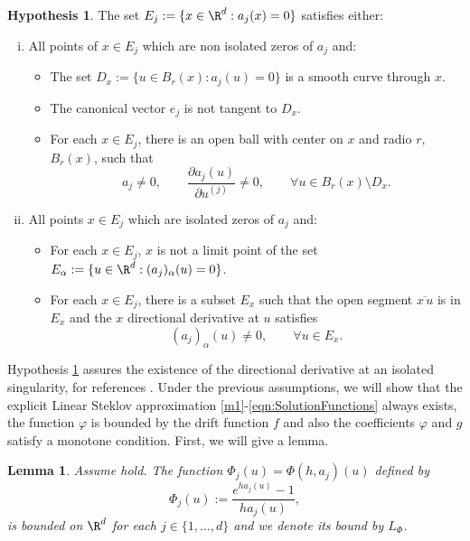 \documentclass[sort&compress, preprint]{elsarticle}
\theoremstyle{definition}
\newtheorem{hypothesis}{Hypothesis}[section]
\theoremstyle{plain}%
\newtheorem{lem}{Lemma}[section]
\theoremstyle{remark}
\begin{document}
\begin{hypothesis}\label{ass:HypThmSingularities}
	The set $E_j:=\{x\in \R^{d}: a_j(x)=0\}$ satisfies either:
	\begin{enumerate}[(i)]
		\item  All points of  $ x\in E_j$  which are non isolated zeros of $a_j$ and:
			\begin{itemize}
				\item The set $D_x:=\{u \in B_r(x): a_j(u)= 0\}$ 
					is a smooth curve through $x$. 
				\item
					The canonical vector $e_j$ is not
					tangent to $D_x$.
				\item
					For each $x \in E_j$, there is an open ball with center
					on $x$ and radio $r$, $B_r(x)$, such that  
					$$
						a_j\neq 0, \qquad
						\frac{\partial a_j(u)}{\partial u^{(j)}} \neq 0 ,\qquad 
						\forall u \in B_r(x)
						\setminus D_x.
					$$	
			\end{itemize}	
		\item
			All points $x \in E_j$ which are isolated zeros of $a_j$ and:
			\begin{itemize}
				\item
					For each $x\in E_j$,  $x$ is not a limit point of the set 
					$E_{\alpha}:=\{u \in \R^d: (a_j)_\alpha(u)=0\}$.
				\item
					For each $x \in E_j$, there is a subset $E_x$ such that the open segment 
					$\overline{x\,u}$ is in $E_x$ and 
					the $x$ directional derivative at $u$ satisfies
					$$
						 (a_j)_\alpha(u) \neq 0, \qquad \forall u\in E_x.
					$$
			\end{itemize}		
	\end{enumerate}	
\end{hypothesis}
Hypothesis \ref{ass:HypThmSingularities} assures  the existence of the directional derivative at an isolated 
singularity, for references \cite{Lawlor2012,FineAIandKass1966}. Under the previous  assumptions, 
we will show that the explicit Linear  Steklov approximation \eqref{m1}-\eqref{eqn:SolutionFunctions} always 
exists, the function $\varphi$ is bounded by the drift function $f$ and also the 
coefficients $\varphi$  and $g$  satisfy a monotone condition. First, we will give a lemma.
\begin{lem}\label{l1}
 Assume  hold. The function $\Phi_j(u)=\Phi(h, a_j)(u)$ 
 defined by
 \begin{equation}\label{eqn:ExpBound}
		\Phi_j(u):=\frac{e^{ha_j(u)}-1}{ha_j(u)},
	\end{equation}
	is bounded  on $\R^d$ for each $j\in \{ 1,\dots, d\}$ 
	and we denote its bound by $L_{\Phi}$.
\end{lem}
\end{document}
